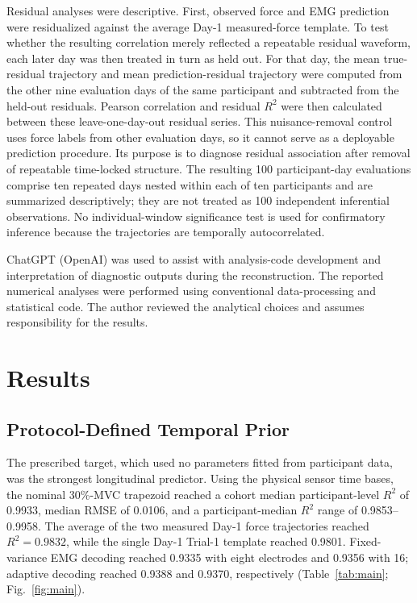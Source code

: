 \documentclass[preprint,12pt]{elsarticle}
\begin{document}
Residual analyses were descriptive. First, observed force and EMG prediction were residualized against the average Day-1 measured-force template. To test whether the resulting correlation merely reflected a repeatable residual waveform, each later day was then treated in turn as held out. For that day, the mean true-residual trajectory and mean prediction-residual trajectory were computed from the other nine evaluation days of the same participant and subtracted from the held-out residuals. Pearson correlation and residual $R^2$ were then calculated between these leave-one-day-out residual series. This nuisance-removal control uses force labels from other evaluation days, so it cannot serve as a deployable prediction procedure. Its purpose is to diagnose residual association after removal of repeatable time-locked structure. The resulting 100 participant-day evaluations comprise ten repeated days nested within each of ten participants and are summarized descriptively; they are not treated as 100 independent inferential observations. No individual-window significance test is used for confirmatory inference because the trajectories are temporally autocorrelated.

ChatGPT (\mbox{OpenAI}) was used to assist with analysis-code development and interpretation of diagnostic outputs during the reconstruction. The reported numerical analyses were performed using conventional data-processing and statistical code. The author reviewed the analytical choices and assumes responsibility for the results.

\section{Results}

\subsection{Protocol-Defined Temporal Prior}

The prescribed target, which used no parameters fitted from participant data, was the strongest longitudinal predictor. Using the physical sensor time bases, the nominal 30\%-MVC trapezoid reached a cohort median participant-level $R^2$ of 0.9933, median RMSE of 0.0106, and a participant-median $R^2$ range of 0.9853--0.9958. The average of the two measured Day-1 force trajectories reached $R^2=0.9832$, while the single Day-1 Trial-1 template reached 0.9801. Fixed-variance EMG decoding reached 0.9335 with eight electrodes and 0.9356 with 16; adaptive decoding reached 0.9388 and 0.9370, respectively (Table~\ref{tab:main}; Fig.~\ref{fig:main}).
\end{document}
